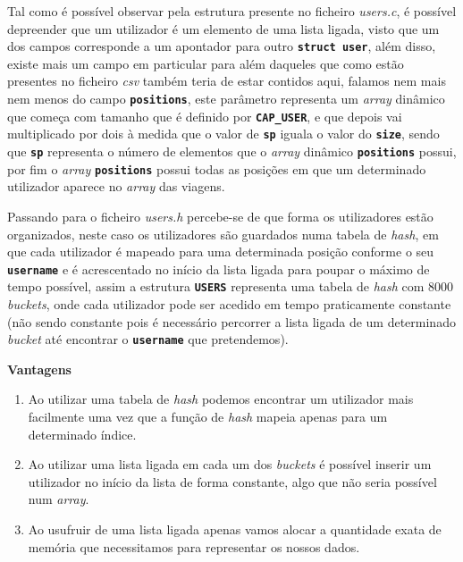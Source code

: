 \documentclass[12pt,a4paper]{report}
\begin{document}
Tal como é possível observar pela estrutura presente no ficheiro \textit{users.c}, é possível depreender que um utilizador é um elemento de uma lista ligada, visto que um dos campos corresponde a um apontador para outro \texttt{\small\textbf{struct user}}, além disso, existe mais um campo em particular para além daqueles que como estão presentes no ficheiro \textit{csv} também teria de estar contidos aqui, falamos nem mais nem menos do campo \texttt{\small\textbf{positions}}, este parâmetro representa um \textit{array} dinâmico que começa com tamanho que é definido por \textbf{\small\texttt{CAP\_USER}}, e que depois vai multiplicado por dois à medida que o valor de \texttt{\small\textbf{sp}} iguala o valor do \small\texttt{\textbf{size}}, sendo que \texttt{\small\textbf{sp}} representa o número de elementos que o \textit{array} dinâmico \texttt{\small\textbf{positions}} possui, por fim o \textit{array} \texttt{\small\textbf{positions}} possui todas as posições em que um determinado utilizador aparece no \textit{array} das viagens.

Passando para o ficheiro \textit{users.h} percebe-se de que forma os utilizadores estão organizados, neste caso os utilizadores são guardados numa tabela de \textit{hash}, em que cada utilizador é mapeado para uma determinada posição conforme o seu \texttt{\small\textbf{username}} e é acrescentado no início da lista ligada para poupar o máximo de tempo possível, assim a estrutura \texttt{\small\textbf{USERS}} representa uma tabela de \textit{hash} com 8000 \textit{buckets}, onde cada utilizador pode ser acedido em tempo praticamente constante (não sendo constante pois é necessário percorrer a lista ligada de um determinado \textit{bucket} até encontrar o \texttt{\small\textbf{username}} que pretendemos).



\normalsize\textbf{Vantagens}
    \begin{enumerate}
        \item Ao utilizar uma tabela de \textit{hash} podemos encontrar um utilizador mais facilmente uma vez que a função de \textit{hash} mapeia apenas para um determinado índice.

        \item Ao utilizar uma lista ligada em cada um dos \textit{buckets} é possível inserir um utilizador no início da lista de forma constante, algo que não seria possível num \textit{array}.
        
        \item Ao usufruir de uma lista ligada apenas vamos alocar a quantidade exata de memória que necessitamos para representar os nossos dados. 
    \end{enumerate}
\end{document}
